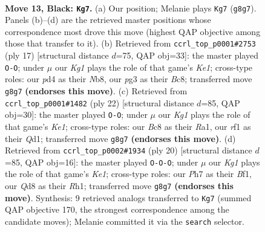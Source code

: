 \documentclass[11pt]{article}
\begin{document}
\begin{figure}[p]
\label{fig:thought-m23}
\end{figure}

\clearpage

\begin{figure}[p]\centering
\begin{subfigure}{0.46\textwidth}\centering
\resizebox{\linewidth}{!}{%
\newchessgame
\chessboard[
  setfen={rnbqr1k1/p3bp1p/2p1p1p1/1p1n4/3P4/3Q1BP1/PP1NPP1P/RNB2RK1 b - - 1 13},
  showmover=false,
  pgfstyle=straightmove, color=movearrow, markmove={g8-g7}
]}
\caption{}
\end{subfigure}\hfill
\begin{subfigure}{0.46\textwidth}\centering
\resizebox{\linewidth}{!}{%
\newchessgame
\chessboard[
  setfen={rnbqk2r/pp2bppp/2p5/3n4/3P1p2/1B3N2/PPP1Q1PP/RNB2RK1 b kq - 1 9},
  showmover=false,
  pgfstyle=straightmove, color=movearrow, markmove={e8-g8}
]}
\caption{}
\end{subfigure}
\\[4pt]
\begin{subfigure}{0.46\textwidth}\centering
\resizebox{\linewidth}{!}{%
\newchessgame
\chessboard[
  setfen={r1bq1rk1/pp3ppp/2pb1n2/3np3/8/PPN1P1N1/1B1P1PPP/RB1QK2R w KQ - 1 12},
  showmover=false,
  pgfstyle=straightmove, color=movearrow, markmove={e1-g1}
]}
\caption{}
\end{subfigure}\hfill
\begin{subfigure}{0.46\textwidth}\centering
\resizebox{\linewidth}{!}{%
\newchessgame
\chessboard[
  setfen={r1b1k2r/1pqnbppp/p2ppn2/6B1/4PP2/PNN5/1PP1Q1PP/R3KB1R w KQkq - 1 11},
  showmover=false,
  pgfstyle=straightmove, color=movearrow, markmove={e1-c1}
]}
\caption{}
\end{subfigure}
\caption{\textbf{Move 13, Black: \texttt{Kg7}.} (a) Our position; Melanie plays \texttt{Kg7} (\texttt{g8g7}). Panels (b)--(d) are the retrieved master positions whose correspondence most drove this move (highest QAP objective among those that transfer to it). (b) Retrieved from \texttt{ccrl\_top\_p0001\#2753} (ply 17) [structural distance $d$=75, QAP obj=33]: the master played \texttt{O-O}; under $\mu$ our \emph{Kg1} plays the role of that game's \emph{Ke1}; cross-type roles: our \emph{p}d4 as their \emph{N}b8, our \emph{p}g3 as their \emph{B}c8; transferred move \texttt{g8g7} \textbf{(endorses this move)}. (c) Retrieved from \texttt{ccrl\_top\_p0001\#1482} (ply 22) [structural distance $d$=85, QAP obj=30]: the master played \texttt{O-O}; under $\mu$ our \emph{Kg1} plays the role of that game's \emph{Ke1}; cross-type roles: our \emph{B}c8 as their \emph{R}a1, our \emph{r}f1 as their \emph{Q}d1; transferred move \texttt{g8g7} \textbf{(endorses this move)}. (d) Retrieved from \texttt{ccrl\_top\_p0002\#1934} (ply 20) [structural distance $d$=85, QAP obj=16]: the master played \texttt{O-O-O}; under $\mu$ our \emph{Kg1} plays the role of that game's \emph{Ke1}; cross-type roles: our \emph{P}h7 as their \emph{B}f1, our \emph{Q}d8 as their \emph{R}h1; transferred move \texttt{g8g7} \textbf{(endorses this move)}. Synthesis: 9 retrieved analogs transferred to \texttt{Kg7} (summed QAP objective 170, the strongest correspondence among the candidate moves); Melanie committed it via the \texttt{search} selector.}

\end{figure}
\end{document}
